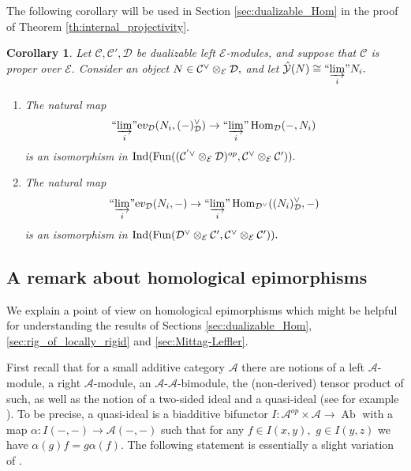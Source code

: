 \documentclass[11pt,leqno]{amsart}
\newtheorem{cor}[theo]{Corollary}
\numberwithin{equation}{section}
\def\Hom{\operatorname{Hom}}
\newcommand{\tens}[1]{%
  \mathbin{\mathop{\otimes}\displaylimits_{#1}}%
}
\newcommand{\indlim}[1][]{\mathop{\varinjlim}\limits_{#1}}
\newcommand{\inddlim}[1][]{{``{\indlim[#1]}"}}
\newcommand{\ev}{\mathrm ev}
\newcommand{\cD}{{\mathcal D}}
\newcommand{\cA}{{\mathcal A}}
\newcommand{\cC}{{\mathcal C}}
\newcommand{\cE}{{\mathcal E}}
\newcommand{\cY}{{\mathcal Y}}
\newcommand{\Fun}{\operatorname{Fun}}
\newcommand{\Ab}{\operatorname{Ab}}
\newcommand{\Ind}{\operatorname{Ind}}
\begin{document}
The following corollary will be used in Section \ref{sec:dualizable_Hom} in the proof of Theorem \ref{th:internal_projectivity}.

\begin{cor}\label{cor:ind_isomorphisms_for_proper} Let $\cC,\cC',\cD$ be dualizable left $\cE$-modules, and suppose that $\cC$ is proper over $\cE.$ Consider an object $N\in\cC^{\vee}\tens{\cE}\cD,$ and let $\hat{\cY}(N)\cong\inddlim[i]N_i.$

\begin{enumerate}[label=(\roman*), ref=(\roman*)]
\item The natural map
\begin{equation*}
\inddlim[i]\ev_{\cD}(N_i,(-)_{\cD}^{\vee})\to \inddlim[i]\Hom_{\cD}(-,N_i)
\end{equation*}
is an isomorphism in $\Ind(\Fun((\cC^{'\vee}\tens{\cE}\cD)^{op},\cC^{\vee}\tens{\cE}\cC')).$ \label{first_ind_isom}
\item The natural map
\begin{equation*}
\inddlim[i]\ev_{\cD}(N_i,-)\to \inddlim[i]\Hom_{\cD^{\vee}}((N_i)_{\cD}^{\vee},-)
\end{equation*}
is an isomorphism in $\Ind(\Fun(\cD^{\vee}\tens{\cE}\cC',\cC^{\vee}\tens{\cE}\cC')).$ \label{second_ind_isom}
\end{enumerate}
\end{cor}

\subsection{A remark about homological epimorphisms}

We explain a point of view on homological epimorphisms which might be helpful for understanding the results of Sections \ref{sec:dualizable_Hom}, \ref{sec:rig_of_locally_rigid} and \ref{sec:Mittag-Leffler}.

First recall that for a small additive category $\cA$ there are notions of a left $\cA$-module, a right $\cA$-module, an  $\cA$-$\cA$-bimodule, the (non-derived) tensor product of such, as well as the notion of a two-sided ideal and a quasi-ideal (see for example \cite[Section 1.8]{E24}). To be precise, a quasi-ideal is a biadditive bifunctor $I:\cA^{op}\times \cA\to\Ab$ with a map $\alpha:I(-,-)\to\cA(-,-)$ such that for any $f\in I(x,y),$ $g\in I(y,z)$ we have $\alpha(g) f=g \alpha(f).$  The following statement is essentially a slight variation of \cite[Lemma 1.47]{E24}.
\end{document}
